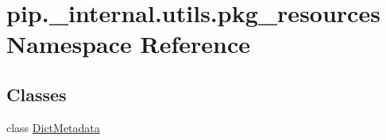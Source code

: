 \hypertarget{namespacepip_1_1__internal_1_1utils_1_1pkg__resources}{}\section{pip.\+\_\+internal.\+utils.\+pkg\+\_\+resources Namespace Reference}
\label{namespacepip_1_1__internal_1_1utils_1_1pkg__resources}
\subsection*{Classes}
\begin{DoxyCompactItemize}
\item 
class \hyperlink{classpip_1_1__internal_1_1utils_1_1pkg__resources_1_1DictMetadata}{Dict\+Metadata}
\end{DoxyCompactItemize}
